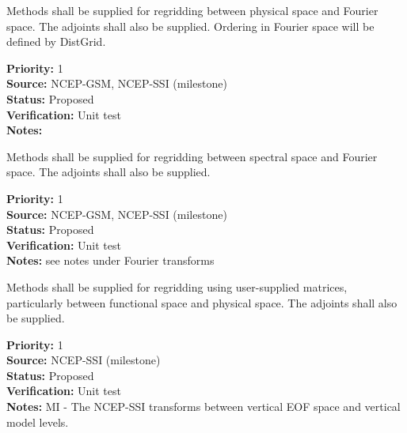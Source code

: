 
Methods shall be supplied for regridding between physical space and
Fourier space.  The adjoints shall also be supplied.  Ordering in
Fourier space will be defined by DistGrid.

\begin{reqlist}
{\bf Priority:} 1 \\
{\bf Source:}  NCEP-GSM, NCEP-SSI (milestone) \\
{\bf Status:} Proposed \\
{\bf Verification:} Unit test \\
{\bf Notes:} 
\end{reqlist}


Methods shall be supplied for regridding between spectral space and
Fourier space.  The adjoints shall also be supplied.

\begin{reqlist}
{\bf Priority:} 1 \\
{\bf Source:}  NCEP-GSM, NCEP-SSI (milestone) \\
{\bf Status:} Proposed \\
{\bf Verification:} Unit test \\
{\bf Notes:} see notes under Fourier transforms
\end{reqlist}


Methods shall be supplied for regridding using user-supplied matrices,
particularly between functional space and physical space.
The adjoints shall also be supplied.

\begin{reqlist}
{\bf Priority:} 1 \\
{\bf Source:}  NCEP-SSI (milestone) \\
{\bf Status:} Proposed \\
{\bf Verification:} Unit test \\
{\bf Notes:} MI - The NCEP-SSI transforms between vertical EOF space
             and vertical model levels.
\end{reqlist}


